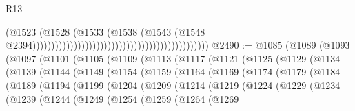 \begin{lexlean}{R13}
\begin{coremodule}
{{{{{{{{{{{{{{{{{{{{{{{{{{{{{{{{{{{{{{{{{{{{{{{{{{{{{{{{{{{{{{{{{{{{{{{{{{{{{{{{{{{{{{{{{{{{{{{{{{{{{{{{{{                                                                                      (@1523
                                                                                        (@1528
                                                                                          (@1533
                                                                                            (@1538
                                                                                              (@1543
                                                                                                (@1548
                                                                                                  @2394)))))))))))))))))))))))))))))))))))))))))))))))
@2490 := @1085
    (@1089
      (@1093
        (@1097
          (@1101
            (@1105
              (@1109
                (@1113
                  (@1117
                    (@1121
                      (@1125
                        (@1129
                          (@1134
                            (@1139
                              (@1144
                                (@1149
                                  (@1154
                                    (@1159
                                      (@1164
                                        (@1169
                                          (@1174
                                            (@1179
                                              (@1184
                                                (@1189
                                                  (@1194
                                                    (@1199
                                                      (@1204
                                                        (@1209
                                                          (@1214
                                                            (@1219
                                                              (@1224
                                                                (@1229
                                                                  (@1234
                                                                    (@1239
                                                                      (@1244
                                                                        (@1249
                                                                          (@1254
                                                                            (@1259
                                                                              (@1264
                                                                                (@1269
}}}}}}}}}}}}}}}}}}}}}}}}}}}}}}}}}}}}}}}}}}}}}}}}}}}}}}}}}}}}}}}}}}}}}}}}}}}}}}}}}}}}}}}}}}}}}}}}}}}}}}}}}}
\end{coremodule}
\end{lexlean}
